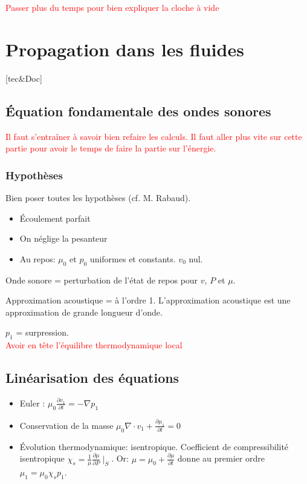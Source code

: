 \documentclass[11pt]{report}
\numberwithin{figure}{section}
\numberwithin{equation}{section}
\numberwithin{table}{section}
\newcommand{\1}{\boldsymbol{1}}
\begin{document}
\textcolor{red}{Passer plus du temps pour bien expliquer la cloche à vide}

\section{Propagation dans les fluides}

[tec\&Doc]

\subsection{Équation fondamentale des ondes sonores}

\textcolor{red}{Il faut s'entraîner à savoir bien refaire les calculs. Il faut aller plus vite sur cette partie pour avoir le temps de faire la partie sur l'énergie.}

\subsubsection{Hypothèses}

Bien poser toutes les hypothèses (cf. M. Rabaud).

\begin{itemize}
\item Écoulement parfait
\item On néglige la pesanteur
\item Au repos: $\mu_0$ et $p_0$ uniformes et constants. $v_0$ nul.
\end{itemize}

Onde sonore = perturbation de l'état de repos pour $v$, $P$ et $\mu$.

Approximation acoustique = à l'ordre 1. L'approximation acoustique est une approximation de grande longueur
d'onde.

$p_1$ = surpression. \\

\textcolor{red}{Avoir en tête l'équilibre thermodynamique local}

\subsection{Linéarisation des équations}

\begin{itemize}
\item Euler : $\mu_0 \frac{\partial v_1}{\partial t} = - \nabla p_1$
\item Conservation de la masse $\mu_0 \nabla \cdot v_1 + \frac{\partial \mu_1}{\partial t} = 0$
\item Évolution thermodynamique: isentropique. Coefficient de compressibilité isentropique $\chi_s = \frac{1}{\mu} \frac{\partial \mu}{\partial P} \mid_S$. Or: $\mu = \mu_0 + \frac{\partial \mu}{\partial t}$ donne au premier ordre $ \mu_1 = \mu_0 \chi_s  p_1$.
\end{itemize}
\end{document}
